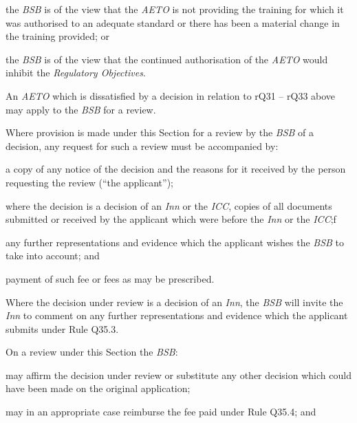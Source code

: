  \item the \emph{BSB} is of the view that the \emph{AETO} is not providing
the training for which it was authorised to an adequate standard or
there has been a material change in the training provided; or

 \item the \emph{BSB} is of the view that the continued authorisation of the
\emph{AETO} would inhibit the \emph{Regulatory Objectives}.\ln


An \emph{AETO} which is dissatisfied by a decision in relation to rQ31
-- rQ33 above may apply to the \emph{BSB} for a review.




Where provision is made under this Section for a review by the
\emph{BSB} of a decision, any request for such a review must be
accompanied by:
\nl
 \item a copy of any notice of the decision and the reasons for it received
by the person requesting the review (``the applicant'');

 \item where the decision is a decision of an \emph{Inn} or the \emph{ICC},
copies of all documents submitted or received by the applicant which
were before the \emph{Inn} or the \emph{ICC};f

 \item any further representations and evidence which the applicant wishes
the \emph{BSB} to take into account; and

 \item payment of such fee or fees as may be prescribed.\ln


Where the decision under review is a decision of an \emph{Inn}, the
\emph{BSB} will invite the \emph{Inn} to comment on any further
representations and evidence which the applicant submits under Rule
Q35.3.


On a review under this Section the \emph{BSB}:

\nl  \item may affirm the decision under review or substitute any other decision
which could have been made on the original application;

 \item may in an appropriate case reimburse the fee paid under Rule Q35.4;
and

